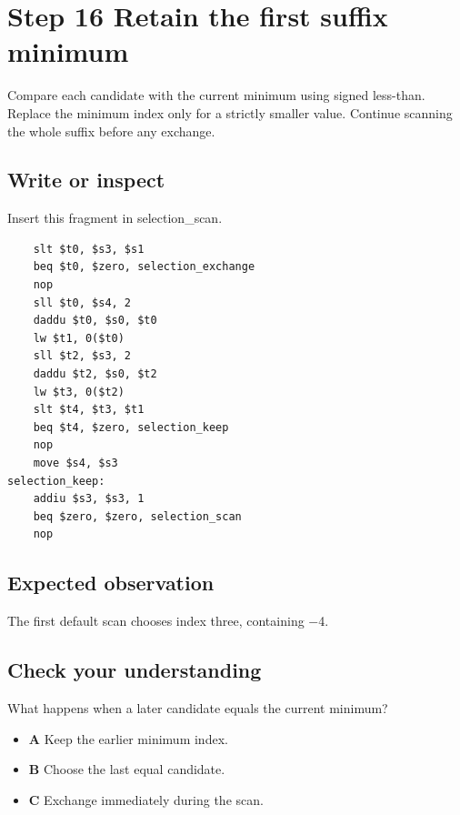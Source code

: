 \section{Step 16 Retain the first suffix
  minimum}\label{009-sorting-visualizer-s16-step-16-retain-the-first-suffix-minimum}

Compare each candidate with the current minimum using signed less-than.
Replace the minimum index only for a strictly smaller value. Continue
scanning the whole suffix before any exchange.

\subsection{Write or
  inspect}\label{009-sorting-visualizer-s16-write-or-inspect}

Insert this fragment in selection\_scan.

\begin{verbatim}
    slt $t0, $s3, $s1
    beq $t0, $zero, selection_exchange
    nop
    sll $t0, $s4, 2
    daddu $t0, $s0, $t0
    lw $t1, 0($t0)
    sll $t2, $s3, 2
    daddu $t2, $s0, $t2
    lw $t3, 0($t2)
    slt $t4, $t3, $t1
    beq $t4, $zero, selection_keep
    nop
    move $s4, $s3
selection_keep:
    addiu $s3, $s3, 1
    beq $zero, $zero, selection_scan
    nop
\end{verbatim}

\subsection{Expected
  observation}\label{009-sorting-visualizer-s16-expected-observation}

The first default scan chooses index three, containing \ensuremath{-}4.

\subsection{Check your
  understanding}\label{009-sorting-visualizer-s16-check-your-understanding}

What happens when a later candidate equals the current minimum?

\begin{itemize}
  \tightlist
  \item
        \textbf{A} Keep the earlier minimum index.
  \item
        \textbf{B} Choose the last equal candidate.
  \item
        \textbf{C} Exchange immediately during the scan.
\end{itemize}
